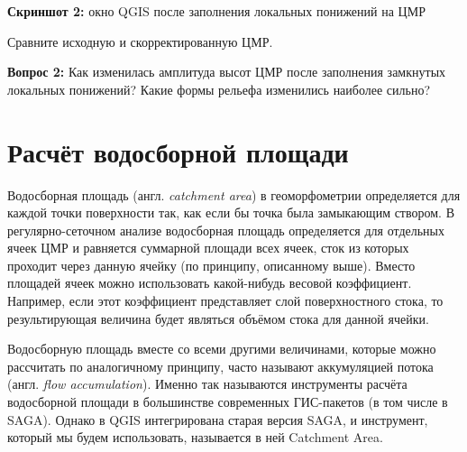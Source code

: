\documentclass[
  12pt,
]{book}
\begin{document}
\textbf{Скриншот 2:} окно QGIS после заполнения локальных понижений на ЦМР

Сравните исходную и скорректированную ЦМР.

\textbf{Вопрос 2:} Как изменилась амплитуда высот ЦМР после заполнения замкнутых локальных понижений? Какие формы рельефа изменились наиболее сильно?

\hypertarget{hydrodem-flowacc}{%
\section{Расчёт водосборной площади}\label{hydrodem-flowacc}}

Водосборная площадь (англ. \emph{catchment area}) в геоморфометрии определяется для каждой точки поверхности так, как если бы точка была замыкающим створом. В регулярно-сеточном анализе водосборная площадь определяется для отдельных ячеек ЦМР и равняется суммарной площади всех ячеек, сток из которых проходит через данную ячейку (по принципу, описанному выше). Вместо площадей ячеек можно использовать какой-нибудь весовой коэффициент. Например, если этот коэффициент представляет слой поверхностного стока, то результирующая величина будет являться объёмом стока для данной ячейки.

Водосборную площадь вместе со всеми другими величинами, которые можно рассчитать по аналогичному принципу, часто называют аккумуляцией потока (англ. \emph{flow accumulation}). Именно так называются инструменты расчёта водосборной площади в большинстве современных ГИС-пакетов (в том числе в SAGA). Однако в QGIS интегрирована старая версия SAGA, и инструмент, который мы будем использовать, называется в ней Catchment Area.
\end{document}
